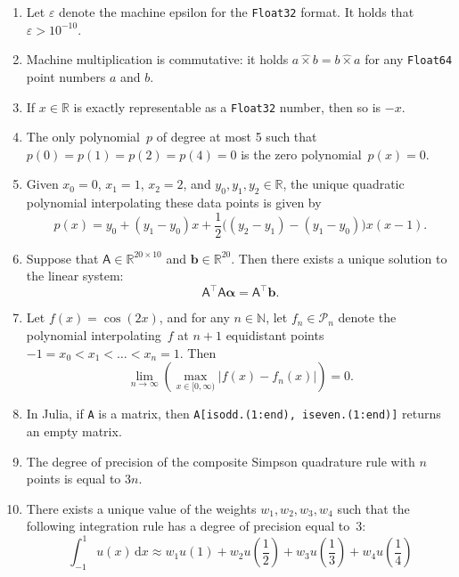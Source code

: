 \documentclass{article}
\newcommand{\julia}[1]{\texttt{#1}}
\begin{document}
\begin{enumerate}

    \item
        Let $\varepsilon$ denote the machine epsilon for the \julia{Float32} format.
        It holds that $\varepsilon > 10^{-10}$.

    \item
        Machine multiplication is commutative:
        it holds $a \widehat \times b = b \widehat \times a$
        for any \julia{Float64} point numbers $a$ and $b$.

    \item
        If $x \in \mathbb R$ is exactly representable as a \julia{Float32} number,
        then so is $-x$.

    \item
        The only polynomial~$p$ of degree at most 5 such that $p(0) = p(1) = p(2) = p(4) = 0$ is the
        zero polynomial~$p(x) = 0$.

    \item
        Given $x_0 = 0$, $x_1 = 1$, $x_2 = 2$,
        and $y_0, y_1, y_2 \in \mathbb R$,
        the unique quadratic polynomial interpolating these data points is given by
        \[
            p(x) =
            y_0 + (y_1 - y_0)  x  + \frac{1}{2} \bigl((y_2 - y_1) - (y_1 - y_0)\bigr) x(x-1).
        \]

    \item
        Suppose that $\mathsf A \in \mathbb R^{20 \times 10}$ and $\mathbf b \in \mathbb R^{20}$.
        Then there exists a unique solution to the linear system:
        \[
            \mathsf A^\top \mathsf A \boldsymbol \alpha = \mathsf A^\top \mathbf b.
        \]
    \item
        Let $f(x) = \cos(2x)$,
        and for any $n \in \mathbb N$,
        let $f_n \in \mathcal P_n$ denote the polynomial interpolating~$f$ at $n+1$ equidistant points $-1 = x_0 < x_1 < \dotsc < x_n = 1$.
        Then
        \[
            \lim_{n \to \infty} \left( \max_{x \in [0, \infty)} \bigl\lvert f(x) - f_n(x) \bigr\rvert \right) = 0.
        \]

    \item
        In Julia, if \julia{A} is a matrix,
        then \julia{A[isodd.(1:end), iseven.(1:end)]} returns an empty matrix.

    \item
        The degree of precision of the composite Simpson quadrature rule with $n$ points is equal to $3n$.

    \item
        There exists a unique value of the weights $w_1, w_2, w_3, w_4$ such that the following integration rule has a degree of precision equal to~$3$:
        \[
            \int_{-1}^{1} u(x) \, \mathrm d x
            \approx w_1 u(1)
            + w_2 u \left(\frac{1}{2} \right)
            + w_3 u \left(\frac{1}{3} \right)
            + w_4 u \left(\frac{1}{4} \right)
        \]

\end{enumerate}
\end{document}
